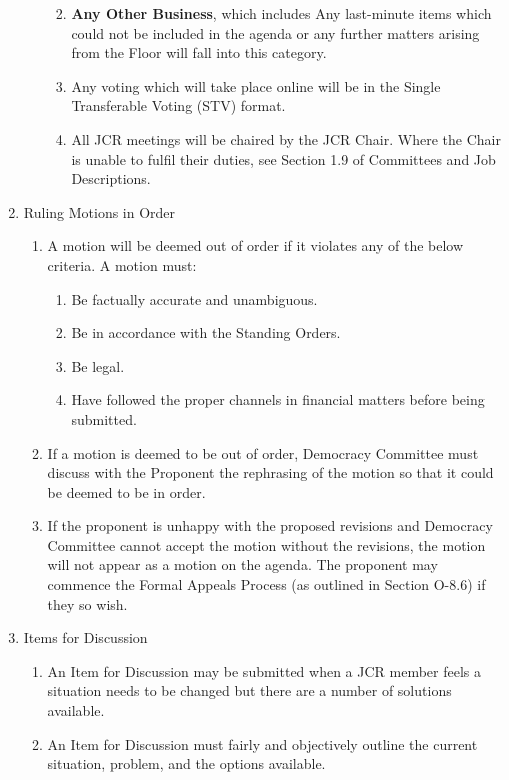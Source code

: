 \begin{enumerate}
\begin{enumerate}
\begin{enumerate}
\begin{enumerate}
            \end{enumerate}
            \item \textbf{Any Other Business}, which includes Any last-minute items which could not be included in the agenda or any further
            matters arising from the Floor will fall into this category.
            \item Any voting which will take place online will be in the Single Transferable Voting (STV) format.
            \item All JCR meetings will be chaired by the JCR Chair. Where the Chair is unable to fulfil their duties, see Section 1.9 of Committees and Job Descriptions.
        \end{enumerate}
    \end{enumerate}
    \item Ruling Motions in Order
    \begin{enumerate}
        \item A motion will be deemed out of order if it violates any of the below criteria. A motion must:
        \begin{enumerate}
            \item Be factually accurate and unambiguous.
            \item Be in accordance with the Standing Orders.
            \item Be legal.
            \item Have followed the proper channels in financial matters before being submitted.
        \end{enumerate}
        \item If a motion is deemed to be out of order, Democracy Committee must discuss with the Proponent
        the rephrasing of the motion so that it could be deemed to be in order.
        \item If the proponent is unhappy with the proposed revisions and Democracy Committee cannot accept the motion without the revisions, the motion will not appear as a motion on the agenda. The proponent may commence the Formal Appeals Process (as outlined in Section O-8.6) if they so wish.
    \end{enumerate}
    \item Items for Discussion
    \begin{enumerate}
        \item An Item for Discussion may be submitted when a JCR member feels a situation needs to be changed but there are a number of solutions available.
        \item An Item for Discussion must fairly and objectively outline the current situation, problem, and the options available.

\end{enumerate}
\end{enumerate}
